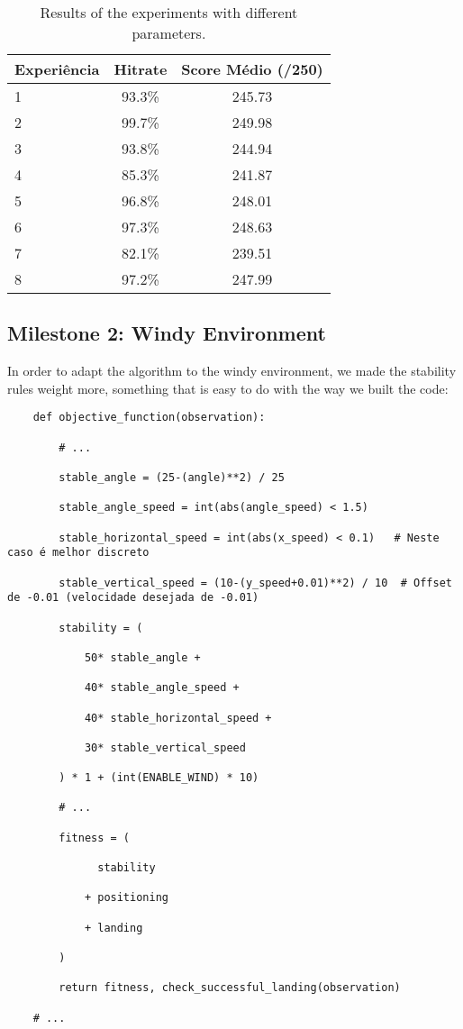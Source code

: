 \documentclass{article}
\begin{document}
\begin{table}[h]
\centering

\begin{tabular}{|l|c|c|}
\hline
\textbf{Experiência} & \textbf{Hitrate} & \textbf{Score Médio (/250)} \\ \hline
1 & 93.3\% & 245.73 \\ \hline
2 & 99.7\% & 249.98 \\ \hline
3 & 93.8\% & 244.94 \\ \hline
4 & 85.3\% & 241.87 \\ \hline
5 & 96.8\% & 248.01 \\ \hline
6 & 97.3\% & 248.63 \\ \hline
7 & 82.1\% & 239.51 \\ \hline
8 & 97.2\% & 247.99 \\ \hline
\end{tabular}
\caption{Results of the experiments with different parameters.}
\end{table}

\subsection{Milestone 2: Windy Environment}
In order to adapt the algorithm to the windy environment, we made the stability rules weight more, something that is easy to do with the way we built the code:
\begin{lstlisting}
    def objective_function(observation):

        # ...

        stable_angle = (25-(angle)**2) / 25

        stable_angle_speed = int(abs(angle_speed) < 1.5)

        stable_horizontal_speed = int(abs(x_speed) < 0.1)   # Neste caso é melhor discreto

        stable_vertical_speed = (10-(y_speed+0.01)**2) / 10  # Offset de -0.01 (velocidade desejada de -0.01)

        stability = (

            50* stable_angle +

            40* stable_angle_speed +

            40* stable_horizontal_speed +

            30* stable_vertical_speed

        ) * 1 + (int(ENABLE_WIND) * 10)

        # ...

        fitness = (

              stability

            + positioning

            + landing

        )

        return fitness, check_successful_landing(observation)

    # ...


\end{lstlisting}
\end{document}

